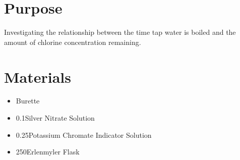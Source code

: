 \documentclass{article}
\begin{document}
\section*{Purpose}
Investigating the relationship between the time tap water is boiled and the amount of chlorine concentration remaining.

\section*{Materials}

\begin{itemize}
	\item Burette
	\item 0.1\mpl Silver Nitrate Solution
	\item 0.25\mpl Potassium Chromate Indicator Solution
	\item 250\millilitre Erlenmyler Flask
\end{itemize}

\begin{}
\end{}
\end{document}
